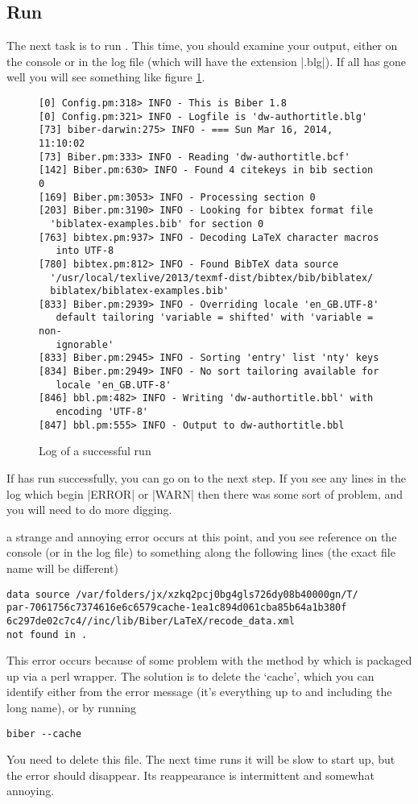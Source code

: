 \subsection{Run }

The next task is to run .  This time, you should
examine your output, either on the console or in the log file (which
will have the extension |.blg|). If all has gone well you will see
something like figure \ref{biber:run}.
\begin{figure}
\begin{Verbatim}[frame=single,fontsize=\small]
[0] Config.pm:318> INFO - This is Biber 1.8
[0] Config.pm:321> INFO - Logfile is 'dw-authortitle.blg'
[73] biber-darwin:275> INFO - === Sun Mar 16, 2014, 11:10:02
[73] Biber.pm:333> INFO - Reading 'dw-authortitle.bcf'
[142] Biber.pm:630> INFO - Found 4 citekeys in bib section 0
[169] Biber.pm:3053> INFO - Processing section 0
[203] Biber.pm:3190> INFO - Looking for bibtex format file 
  'biblatex-examples.bib' for section 0
[763] bibtex.pm:937> INFO - Decoding LaTeX character macros 
   into UTF-8
[780] bibtex.pm:812> INFO - Found BibTeX data source 
  '/usr/local/texlive/2013/texmf-dist/bibtex/bib/biblatex/
  biblatex/biblatex-examples.bib'
[833] Biber.pm:2939> INFO - Overriding locale 'en_GB.UTF-8' 
   default tailoring 'variable = shifted' with 'variable = non-
   ignorable'
[833] Biber.pm:2945> INFO - Sorting 'entry' list 'nty' keys
[834] Biber.pm:2949> INFO - No sort tailoring available for
   locale 'en_GB.UTF-8'
[846] bbl.pm:482> INFO - Writing 'dw-authortitle.bbl' with 
   encoding 'UTF-8'
[847] bbl.pm:555> INFO - Output to dw-authortitle.bbl
\end{Verbatim}
\caption{Log of a successful  run\label{biber:run}}
\end{figure}

If  has run successfully, you can go on to the next
step. If you see any lines in the log which begin |ERROR| or |WARN|
then there was some sort of problem, and you will need to do more
digging.

\label{cache} a strange and annoying
error occurs at this point, and you see reference on the console (or
in the log file) to something along the following lines (the exact
file name will be different)
\begin{verbatim}
data source /var/folders/jx/xzkq2pcj0bg4gls726dy08b40000gn/T/
par-7061756c7374616e6c6579cache-1ea1c894d061cba85b64a1b380f
6c297de02c7c4//inc/lib/Biber/LaTeX/recode_data.xml 
not found in .
\end{verbatim}
This error occurs because of some problem with the method by which
 is packaged up via a perl wrapper. The solution is to
delete the `cache', which you can identify either from the error
message (it's everything up to and including the long name), or by
running
\begin{verbatim}
biber --cache
\end{verbatim}
You need to delete this file. The next time  runs it
will be slow to start up, but the error should disappear. Its
reappearance is intermittent and somewhat annoying.

